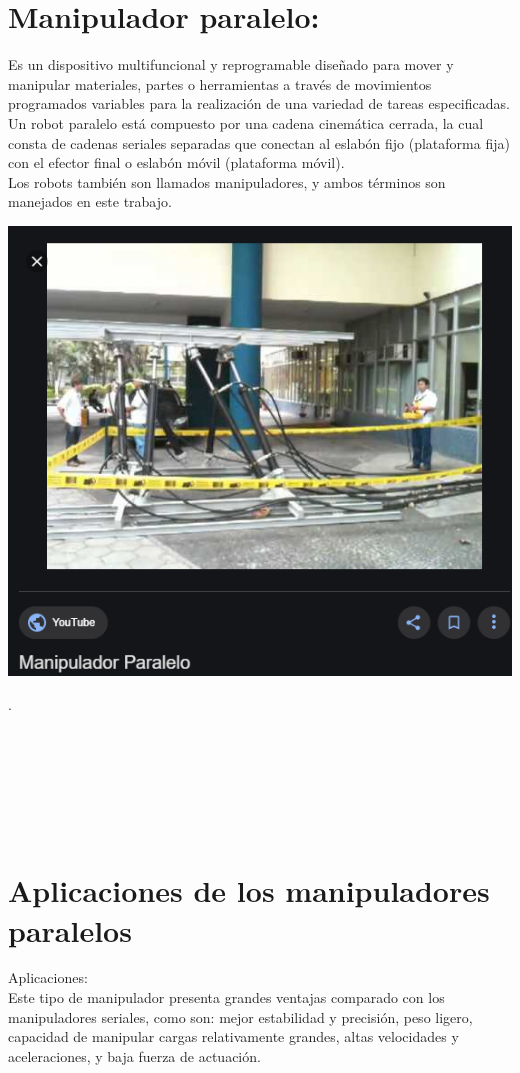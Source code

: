 \documentclass[12pt,a4paper]{article}
\begin{document}
\section{Manipulador paralelo:}
Es un dispositivo multifuncional y reprogramable diseñado para mover y manipular materiales, partes o herramientas a través de movimientos programados variables para la realización de una variedad de tareas especificadas.\\
Un robot paralelo está compuesto por una cadena cinemática cerrada, la cual consta de cadenas seriales separadas que conectan al eslabón fijo (plataforma fija) con el efector final o eslabón móvil (plataforma móvil).\\
Los robots también son llamados manipuladores, y ambos términos son manejados en este trabajo.\\
\begin{center}
\includegraphics[scale=1]{3.PNG}
\end{center}
.\\\\\\\\\\\\\
\section{Aplicaciones de los manipuladores paralelos} 
Aplicaciones:\\
Este tipo de manipulador presenta grandes ventajas comparado con los manipuladores seriales, como son: mejor estabilidad y precisión, peso ligero, capacidad de manipular cargas relativamente grandes, altas velocidades y aceleraciones, y baja fuerza de actuación.\\
\end{document}
